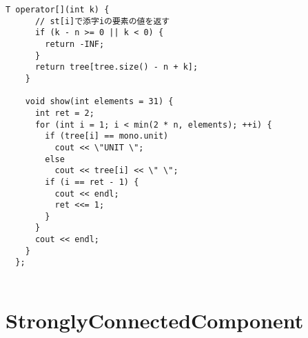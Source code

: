 \documentclass{jsarticle}
\begin{document}
\begin{lstlisting}[caption=SegmentTree]
    T operator[](int k) {
      // st[i]で添字iの要素の値を返す
      if (k - n >= 0 || k < 0) {
        return -INF;
      }
      return tree[tree.size() - n + k];
    }
  
    void show(int elements = 31) {
      int ret = 2;
      for (int i = 1; i < min(2 * n, elements); ++i) {
        if (tree[i] == mono.unit)
          cout << \"UNIT \";
        else
          cout << tree[i] << \" \";
        if (i == ret - 1) {
          cout << endl;
          ret <<= 1;
        }
      }
      cout << endl;
    }
  };
  

\end{lstlisting}

\color{white}
\section{StronglyConnectedComponent}
\color{black}
\end{document}
